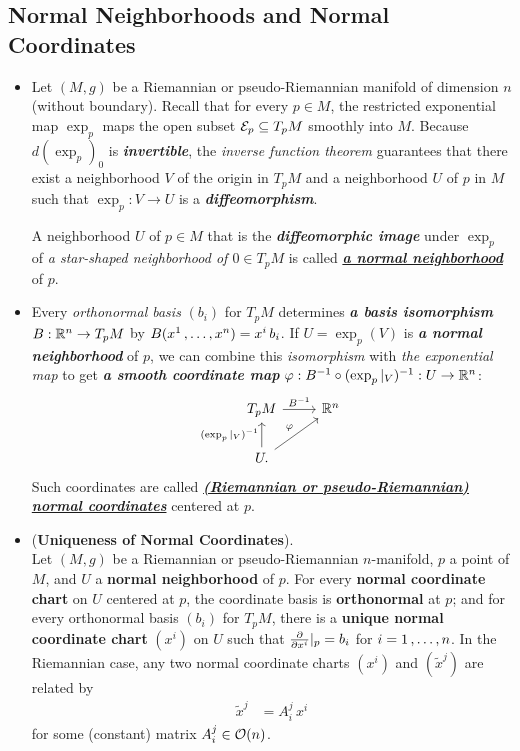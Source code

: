 \documentclass[11pt]{article}
\begin{document}
\subsection{Normal Neighborhoods and Normal Coordinates}
\begin{itemize}
\item \begin{definition}
Let $(M, g)$ be a Riemannian or pseudo-Riemannian manifold of dimension $n$ (without boundary). Recall that for every $p \in M$, the restricted exponential map $\exp_p$ maps the open subset ${\mathcal E}_p \subseteq T_{p}M$ smoothly into $M$. Because $d(\exp_p)_0$ is \emph{\textbf{invertible}}, the \emph{inverse function theorem} guarantees that there exist a neighborhood $V$ of the origin in $T_{p}M$ and a neighborhood $U$ of $p$ in $M$ such that $\exp_p: V \rightarrow U$ is a \emph{\textbf{diffeomorphism}}. 

A neighborhood $U$ of $p \in M$ that is the \emph{\textbf{diffeomorphic image}} under $\exp_p$ of \emph{a star-shaped neighborhood of $0 \in T_{p}M$} is called \underline{\emph{\textbf{a normal neighborhood}}} of $p$.
\end{definition}

\item \begin{definition}
Every \emph{orthonormal basis} $(b_i)$ for $T_{p}M$ determines \emph{\textbf{a basis isomorphism}} $B: {\mathbb R}^n \rightarrow T_{p}M$ by $B(x^1 \,{,}\ldots{,}\, x^n) = x^i\,b_i$. If $U = \exp_{p}(V)$ is \emph{\textbf{a normal neighborhood}} of $p$, we can combine this \emph{isomorphism} with \emph{the exponential map} to get \emph{\textbf{a smooth coordinate map}} $\varphi: B^{-1} \circ (\exp_p|_{V})^{-1}: U \rightarrow {\mathbb R}^n$:
\[
  \begin{tikzcd}
   T_{p}M  \arrow{r}{B^{-1}} & \bR^{n} \\
    U. \arrow{u}{(\exp_p|_{V})^{-1}} \arrow{ur}{\varphi} & 
  \end{tikzcd}
\] 
Such coordinates are called \underline{\emph{\textbf{(Riemannian or pseudo-Riemannian) normal coordinates}}} centered at $p$.
\end{definition}

\item \begin{proposition} (\textbf{Uniqueness of Normal Coordinates}). \citep{lee2018introduction} \\
Let $(M, g)$ be a Riemannian or pseudo-Riemannian $n$-manifold, $p$ a point of $M$, and $U$ a \textbf{normal neighborhood} of $p$. For every \textbf{normal coordinate chart} on $U$ centered at $p$, the coordinate basis is \textbf{orthonormal} at $p$; and for every orthonormal basis $(b_i)$ for $T_{p}M$, there is a \textbf{unique normal coordinate chart} $(x^i)$ on $U$ such that $\frac{\partial }{ \partial x^i}|_{p} = b_i$ for $i = 1 \,{,}\ldots{,}\, n$. In the Riemannian case, any two normal coordinate charts $(x^i)$ and $(\widetilde{x}^j)$ are related by
\begin{align}
\widetilde{x}^j &= A_i^j \,x^i  \label{eqn: normal_coordinate_change_of_coordinate}
\end{align} for some (constant) matrix $A_{i}^{j} \in {\mathcal O}(n)$.
\end{proposition}


\end{itemize}
\end{document}
